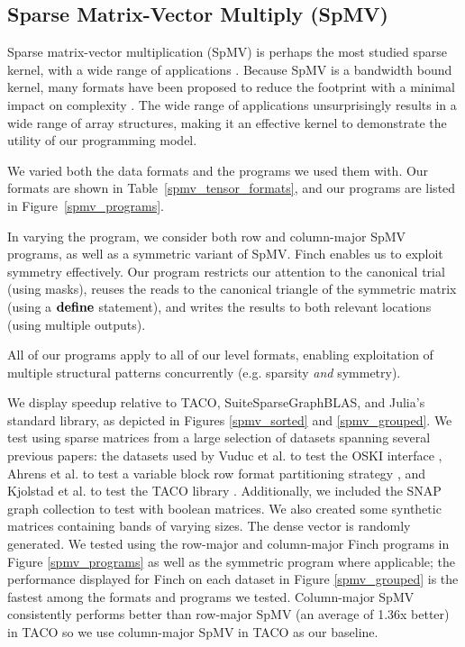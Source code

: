 \subsection{Sparse Matrix-Vector Multiply (SpMV)}
Sparse matrix-vector multiplication (SpMV) is perhaps the most studied sparse
kernel, with a wide range of applications \cite{liu_csr5_2015,
zhou_enabling_2020}. Because SpMV is a bandwidth bound kernel, many formats have
been proposed to reduce the footprint with a minimal impact on complexity
\cite{langr_evaluation_2016}. The wide range of applications unsurprisingly
results in a wide range of array structures, making it an effective kernel to
demonstrate the utility of our programming model. 

We varied both the data formats and the programs we used them with. Our formats
are shown in Table~\ref{spmv_tensor_formats}, and our programs are listed in
Figure~\ref{spmv_programs}.

In varying the program, we consider both row and column-major SpMV programs, as
well as a symmetric variant of SpMV. Finch enables us to exploit symmetry
effectively. Our program restricts our attention to the canonical trial (using
masks), reuses the reads to the canonical triangle of the symmetric matrix
(using a $\text{\textbf{define}}$ statement), and writes the results to both relevant
locations (using multiple outputs).

All of our programs apply to all of our level formats, enabling exploitation of multiple structural patterns concurrently (e.g. sparsity \textit{and} symmetry).

We display speedup relative to TACO, SuiteSparseGraphBLAS, and Julia’s standard library, as depicted in Figures \ref{spmv_sorted} and \ref{spmv_grouped}.  We test using sparse matrices from a large selection of datasets spanning several previous papers: the datasets used by Vuduc et al. to test the OSKI interface \cite{vuduc2005oski}, Ahrens et al. to test a variable block row format partitioning strategy \cite{ahrens_optimal_2021}, and Kjolstad et al. to test the TACO library \cite{kjolstad_tensor_2017}. Additionally, we included the SNAP graph collection to test with boolean matrices. We also created some synthetic matrices containing bands of varying sizes.
The dense vector is randomly generated. We tested using the row-major and column-major Finch programs in Figure \ref{spmv_programs} as well as the symmetric program where applicable; the performance displayed for Finch on each dataset in Figure \ref{spmv_grouped} is the fastest among the formats and programs we tested. Column-major SpMV consistently performs better than row-major SpMV (an average of 1.36x better) in TACO so we use column-major SpMV in TACO as our baseline.

